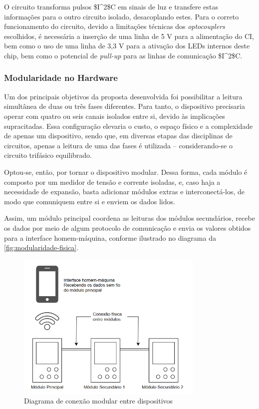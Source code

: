 O circuito transforma pulsos \gls{$I^2$C} em sinais de luz e transfere estas informações para o outro circuito isolado, desacoplando estes. Para o correto funcionamento do circuito, devido a limitações técnicas dos \textit{optocouplers} escolhidos, é necessária a inserção de uma linha de 5 V para a alimentação do \gls{CI}, bem como o uso de uma linha de 3,3 V para a ativação dos LEDs internos deste chip, bem como o potencial de \textit{pull-up} para as linhas de comunicação \gls{$I^2$C}.

\subsubsection{Modularidade no Hardware}\label{modularidade-metodologia}

Um dos principais objetivos da proposta desenvolvida foi possibilitar a leitura simultânea de duas ou três fases diferentes. Para tanto, o dispositivo precisaria operar com quatro ou seis canais isolados entre si, devido às implicações supracitadas. Essa configuração elevaria o custo, o espaço físico e a complexidade de apenas um dispositivo, sendo que, em diversas etapas das disciplinas de circuitos, apenas a leitura de uma das fases é utilizada – considerando-se o circuito trifásico equilibrado.

Optou-se, então, por tornar o dispositivo modular. Dessa forma, cada módulo é composto por um medidor de tensão e corrente isoladas, e, caso haja a necessidade de expansão, basta adicionar módulos extras e interconectá-los, de modo que comuniquem entre si e enviem os dados lidos.

Assim, um módulo principal coordena as leituras dos módulos secundários, recebe os dados por meio de algum protocolo de comunicação e envia os valores obtidos para a interface homem-máquina, conforme ilustrado no diagrama da \autoref{fig:modularidade-fisica}.

\begin{figure}[htb!]
    \caption{Diagrama de conexão modular entre dispositivos}
    \label{fig:modularidade-fisica}
    \includegraphics[width=0.8\textwidth]{figuras/mod-fisica.png}
    \fonte{}
\end{figure}

